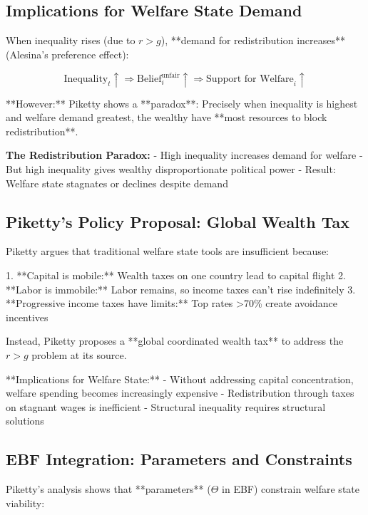 \subsection{Implications for Welfare State Demand}

When inequality rises (due to $r > g$), **demand for redistribution increases** (Alesina's preference effect):

\begin{equation}
\text{Inequality}_t \uparrow \Rightarrow \text{Belief}_i^{\text{unfair}} \uparrow \Rightarrow \text{Support for Welfare}_i \uparrow
\end{equation}

**However:** Piketty shows a **paradox**: Precisely when inequality is highest and welfare demand greatest, the wealthy have **most resources to block redistribution**.

\textbf{The Redistribution Paradox:}
- High inequality increases demand for welfare
- But high inequality gives wealthy disproportionate political power
- Result: Welfare state stagnates or declines despite demand

\subsection{Piketty's Policy Proposal: Global Wealth Tax}

Piketty argues that traditional welfare state tools are insufficient because:

1. **Capital is mobile:** Wealth taxes on one country lead to capital flight
2. **Labor is immobile:** Labor remains, so income taxes can't rise indefinitely
3. **Progressive income taxes have limits:** Top rates >70\% create avoidance incentives

Instead, Piketty proposes a **global coordinated wealth tax** to address the $r > g$ problem at its source.

**Implications for Welfare State:**
- Without addressing capital concentration, welfare spending becomes increasingly expensive
- Redistribution through taxes on stagnant wages is inefficient
- Structural inequality requires structural solutions

\subsection{EBF Integration: Parameters and Constraints}

Piketty's analysis shows that **parameters** ($\Theta$ in EBF) constrain welfare state viability:

